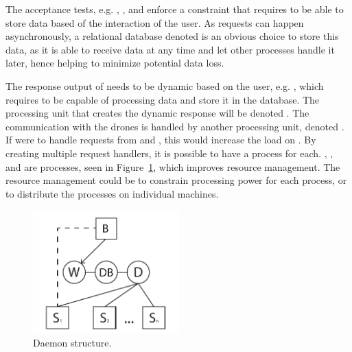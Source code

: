 The acceptance tests, e.g. , , and  enforce a constraint that requires  to be able to store data based of the interaction of the user.
As requests can happen asynchronously, a relational database denoted  is an obvious choice to store this data, as it is able to receive data at any time and let other processes handle it later, hence helping to minimize potential data loss.

The response output of  needs to be dynamic based on the user, e.g. , which requires  to be capable of processing data and store it in the database.
The processing unit that creates the dynamic response will be denoted .
The communication with the drones is handled by another processing unit, denoted .
If  were to handle requests from  and , this would increase the load on .
By creating multiple request handlers, it is possible to have a process for each. , , and  are processes, seen in Figure~\ref{fig:daemon_structure}, which improves resource management.
The resource management could be to constrain processing power for each process, or to distribute the processes on individual machines.

\begin{figure}[htb]
    \centering
    \includegraphics[width=0.5\textwidth]{gfx/daemon_structure.pdf}
    \caption{Daemon structure.}
    \label{fig:daemon_structure}
\end{figure}


